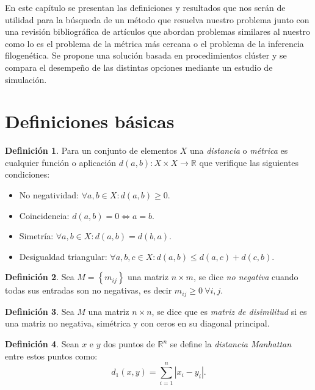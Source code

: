 \documentclass[12pt]{report} %
\theoremstyle{definition}
\newtheorem{definition}{Definición}[section]
\begin{document}
{En este capítulo se presentan las definiciones y resultados que nos serán de utilidad para la búsqueda de un método que resuelva nuestro problema junto con una revisión bibliográfica de artículos que abordan problemas similares al nuestro como lo es el problema de la métrica más cercana o el problema de la inferencia filogenética. Se propone una solución basada en procedimientos clúster y se compara el desempeño de las distintas opciones mediante un estudio de simulación.

\section{Definiciones básicas}

\begin{definition}\label{distancias}
Para un conjunto de elementos $X$ una \textit{distancia} o \textit{métrica} es cualquier función o aplicación $d(a,b): X \times X \rightarrow \mathbb{R}$ que verifique las siguientes condiciones:	
	\begin{itemize}
		\item No negatividad: $\forall a,b \in X: d(a,b) \geq 0$.
		\item Coincidencia: $d(a,b)=0 \iff a=b$.
		\item Simetría: $\forall a,b \in X : d(a,b)=d(b,a)$.
		\item Desigualdad triangular: $\forall a,b,c \in X: d(a,b) \leq d(a,c) + d(c,b)$. \cite{Rudin}
	\end{itemize}
\end{definition}

\begin{definition}
	Sea $M = \left\lbrace m_{ij} \right\rbrace $ una matriz $n \times m$, se dice \textit{no negativa} cuando todas sus entradas son no negativas, es decir $m_{ij} \geq 0 \  \forall i,j $.
\end{definition}

\begin{definition}
		Sea $M$ una matriz $n \times n$, se dice que es \textit{matriz de disimilitud} si es una matriz no negativa, simétrica y con ceros en su diagonal principal.\cite{MetricNearnessProblemApplications}
\end{definition}

\begin{definition}
Sean $x$ e $y$ dos puntos de $\mathbb{R}^n$ se define la \textit{distancia Manhattan} \cite{distances} entre estos puntos como:
\begin{equation}
	d_1(x,y) = \sum_{i=1}^{n}\left| x_i-y_i \right|.
\end{equation}
\end{definition}

}
\end{document}
